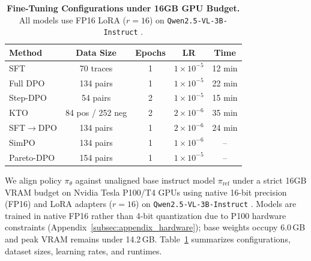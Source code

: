 \documentclass[11pt]{article}
\begin{document}
\begin{table}[t]
\centering
\footnotesize
\setlength{\tabcolsep}{2.5pt}
\begin{tabular}{lcccc}
\toprule
\textbf{Method} & \textbf{Data Size} & \textbf{Epochs} & \textbf{LR} & \textbf{Time} \\
\midrule
SFT & 70 traces & 1 & $1\times 10^{-5}$ & 12 min \\
Full DPO & 134 pairs & 1 & $1\times 10^{-5}$ & 22 min \\
Step-DPO & 54 pairs & 2 & $1\times 10^{-5}$ & 15 min \\
KTO & 84 pos / 252 neg & 2 & $2\times 10^{-6}$ & 35 min \\
SFT$\rightarrow$DPO & 134 pairs & 1 & $2\times 10^{-6}$ & 24 min \\
SimPO & 134 pairs & 1 & $1\times 10^{-6}$ & -- \\
Pareto-DPO & 154 pairs & 1 & $1\times 10^{-5}$ & -- \\
\bottomrule
\end{tabular}
\caption{\textbf{Fine-Tuning Configurations under 16GB GPU Budget.} All models use FP16 LoRA ($r=16$) on \texttt{Qwen2.5-VL-3B-Instruct} \citep{bai2025qwen25vl}.}
\label{tab:training_setup}
\end{table}

We align policy $\pi_\theta$ against unaligned base instruct model $\pi_{\text{ref}}$ under a strict 16GB VRAM budget on Nvidia Tesla P100/T4 GPUs using native 16-bit precision (FP16) and LoRA adapters ($r=16$) \citep{hu2021lora} on \texttt{Qwen2.5-VL-3B-Instruct} \citep{bai2025qwen25vl}. Models are trained in native FP16 rather than 4-bit quantization due to P100 hardware constraints (Appendix~\ref{subsec:appendix_hardware}); base weights occupy 6.0\,GB and peak VRAM remains under 14.2\,GB. Table~\ref{tab:training_setup} summarizes configurations, dataset sizes, learning rates, and runtimes.
\end{document}
